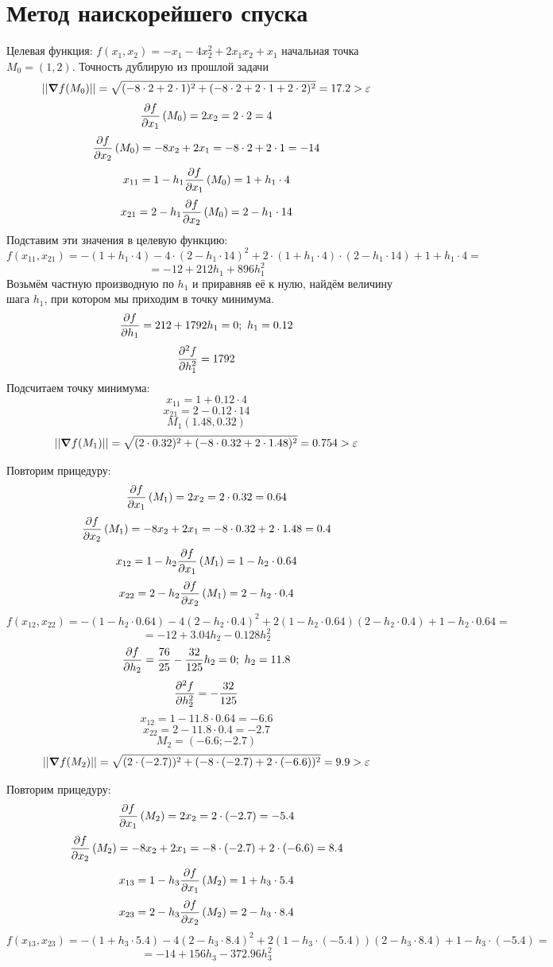 \documentclass{article}
\begin{document}
\section*{Метод наискорейшего спуска}
Целевая функция: $f(x_1, x_2) = -x_1-4x_2^2+2x_1x_2+x_1$ начальная точка $M_0 = (1, 2)$. Точность дублирую из прошлой задачи
\[||\grad f(M_0)|| = \sqrt{(-8\cdot 2+ 2\cdot 1)^2 + (-8\cdot 2+ 2\cdot 1 + 2\cdot 2)^2} = 17.2> \varepsilon\]
\[\pdv{f}{x_1} \left(M_0\right) = 2x_2 = 2\cdot 2 = 4\]
\[\pdv{f}{x_2} \left(M_0\right) = -8x_2+2x_1 = -8\cdot 2+ 2\cdot 1 = -14\]
\[x_{11} = 1 - h_1 \pdv{f}{x_1} \left(M_0\right) = 1 + h_1\cdot 4 \]
\[x_{21} = 2 - h_1 \pdv{f}{x_2} \left(M_0\right) = 2 - h_1\cdot 14 \]
Подставим эти значения в целевую функцию:
\[f(x_{11}, x_{21}) = -(1 + h_1\cdot 4) - 4\cdot (2 - h_1\cdot 14)^2 + 2\cdot (1 + h_1\cdot 4)\cdot (2 - h_1\cdot 14) +  1 + h_1\cdot 4 =\]
\[= -12 +212h_1+896h_1^2\]
Возьмём частную производную по $h_1$ и приравняв её к нулю, найдём величину шага $h_1$, при котором мы приходим в точку минимума.
\[\pdv{f}{h_1} = 212+1792h_1 = 0;\ h_1 = 0.12\]
\[\pdv{^2f}{h_1^2} = 1792\]
Подсчитаем точку минимума:
\[x_{11} = 1 + 0.12\cdot 4\]
\[x_{21} = 2 - 0.12\cdot 14\]
\[M_1(1.48, 0.32)\]
\[||\grad f(M_1)|| = \sqrt{(2\cdot 0.32)^2 + (-8\cdot 0.32 + 2\cdot 1.48)^2} = 0.754> \varepsilon\]

Повторим прицедуру:
\[\pdv{f}{x_1} \left(M_1\right) = 2x_2 = 2\cdot 0.32 = 0.64\]
\[\pdv{f}{x_2} \left(M_1\right) = -8x_2+2x_1 = -8\cdot 0.32+ 2\cdot 1.48 = 0.4\]
\[x_{12} = 1 - h_2 \pdv{f}{x_1} \left(M_1\right) = 1 - h_2\cdot 0.64 \]
\[x_{22} = 2 - h_2 \pdv{f}{x_2} \left(M_1\right) = 2 - h_2\cdot 0.4 \]
\[f(x_{12}, x_{22}) = -(1 - h_2\cdot 0.64)-4(2 - h_2\cdot 0.4)^2+2(1 - h_2\cdot 0.64)(2 - h_2\cdot 0.4)+1 - h_2\cdot 0.64 = \]
\[ = -12 + 3.04h_2-0.128h_2^2\]
\[\pdv{f}{h_2} = \frac{76}{25} - \frac{32}{125}h_2 = 0;\ h_2 = 11.8\]
\[\pdv{^2f}{h_2^2} = -\frac{32}{125}\]
\[x_{12} = 1 - 11.8\cdot 0.64  = -6.6\]
\[x_{22} = 2 - 11.8\cdot 0.4 = -2.7\]
\[M_2 = (-6.6; -2.7)\]
\[||\grad f(M_2)|| = \sqrt{(2\cdot (-2.7))^2 + (-8\cdot (-2.7) + 2\cdot (-6.6))^2} = 9.9> \varepsilon\]

Повторим прицедуру:
\[\pdv{f}{x_1} \left(M_2\right) = 2x_2 = 2\cdot (-2.7) = -5.4\]
\[\pdv{f}{x_2} \left(M_2\right) = -8x_2+2x_1 = -8\cdot (-2.7)+ 2\cdot (-6.6) = 8.4\]
\[x_{13} = 1 - h_3 \pdv{f}{x_1} \left(M_2\right) = 1 + h_3\cdot 5.4 \]
\[x_{23} = 2 - h_3 \pdv{f}{x_2} \left(M_2\right) = 2 - h_3\cdot 8.4 \]
\[f(x_{13}, x_{23}) = -(1 + h_3\cdot 5.4 )-4(2 - h_3\cdot 8.4)^2+2(1 - h_3\cdot (-5.4))(2 - h_3\cdot 8.4)+1 - h_3\cdot (-5.4) = \]
\[ = -14+156h_3-372.96h_3^2\]
\end{document}
